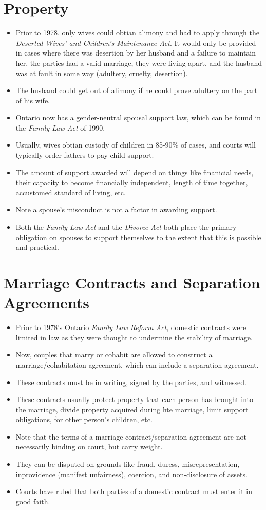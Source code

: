\documentclass{article}
\begin{document}
\section{Property}
\begin{itemize}
    \item Prior to 1978, only wives could obtian alimony and had to apply through the \emph{Deserted Wives' and Children's Maintenance Act}.  It would only be provided in cases where there was desertion by her husband and a failure to maintain her, the parties had a valid marriage, they were living apart, and the husband was at fault in some way (adultery, cruelty, desertion).
    \item The husband could get out of alimony if he could prove adultery on the part of his wife.
    \item Ontario now has a gender-neutral spousal support law, which can be found in the \emph{Family Law Act} of 1990.
    \item Usually, wives obtian custody of children in 85-90\% of cases, and courts will typically order fathers to pay child support.
    \item The amount of support awarded will depend on things like finanicial needs, their capacity to become financially independent, length of time together, accustomed standard of living, etc.
    \item Note a spouse's misconduct is not a factor in awarding support.
    \item Both the \emph{Family Law Act} and the \emph{Divorce Act} both place the primary obligation on spouses to support themselves to the extent that this is possible and practical.
\end{itemize}

\section{Marriage Contracts and Separation Agreements}
\begin{itemize}
    \item Prior to 1978's Ontario \emph{Family Law Reform Act}, domestic contracts were limited in law as they were thought to undermine the stability of marriage.
    \item Now, couples that marry or cohabit are allowed to construct a marriage/cohabitation agreement, which can include a separation agreement.
    \item These contracts must be in writing, signed by the parties, and witnessed.
    \item These contracts usually protect property that each person has brought into the marriage, divide property acquired during hte marriage, limit support obligations, for other person's children, etc.
    \item Note that the terms of a marriage contract/separation agreement are not necessarily binding on court, but carry weight.
    \item They can be disputed on grounds like fraud, duress, misrepresentation, inprovidence (manifest unfairness), coercion, and non-disclosure of assets.
    \item Courts have ruled that both parties of a domestic contract must enter it in good faith.
\end{itemize}
\end{document}
